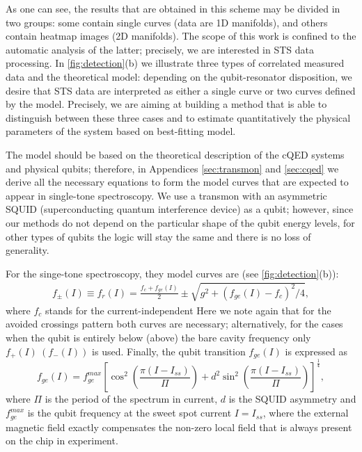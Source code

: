 \documentclass[%
 aip,
 draft,
 amsmath,amssymb,
 reprint,%
]{revtex4-1}
\begin{document}
As one can see, the results that are obtained in this scheme may be divided in two groups: some contain single curves (data are 1D manifolds), and others contain heatmap images (2D manifolds). The scope of this work is confined to the automatic analysis of the latter; precisely, we are interested in STS data processing. In \autoref{fig:detection}(b) we illustrate three types of correlated measured data and the theoretical model: depending on the qubit-resonator disposition, we desire that STS data are interpreted as either a single curve or two curves defined by the model. Precisely, we are aiming at building a method that is able to distinguish between these three cases and to estimate quantitatively the physical parameters of the system based on best-fitting model. 

The model should be based on the theoretical description of the cQED systems and physical qubits; therefore, in Appendices \ref{sec:transmon} and \ref{sec:cqed} we derive all the necessary equations to form the model curves that are expected to appear in single-tone spectroscopy. We use a transmon\cite{koch2007} with an asymmetric SQUID (superconducting quantum interference device) as a qubit; however, since our methods do not depend on the particular shape of the qubit energy levels, for other types of qubits the logic will stay the same and there is no loss of generality.

For the singe-tone spectroscopy, they model curves are (see \autoref{fig:detection}(b)):
\begin{align}
f_\pm(I) \equiv f_r(I) = \frac{f_c + f_{ge}(I)}{2} \pm \sqrt{g^2+(f_{ge}(I) - f_c)^2/4},\label{eq:f_r}
\end{align}
where $f_c$ stands for the current-independent  Here we note again that for the avoided crossings pattern both curves are necessary; alternatively, for the cases when the qubit is entirely below (above) the bare cavity frequency only $ f_+(I)\ \left(f_-(I)\right)$ is used. Finally, the qubit transition $f_{ge}(I)$ is expressed as
\begin{equation}
f_{ge}(I) = f_{ge}^{max} \left[\cos^2\left(\frac{\pi(I-I_{ss})}{\Pi}\right)+d^2 \sin^2 \left(\frac{\pi(I-I_{ss})}{\Pi}\right)\right]^\frac{1}{4},
\label{eq:tr_spectrum}
\end{equation}
where $\Pi$ is the period of the spectrum in current, $d$ is the SQUID asymmetry and $f_{ge}^{max}$ is the qubit frequency at the sweet spot current $I = I_{ss}$, where the external magnetic field exactly compensates the non-zero local field that is always present on the chip in experiment.
\end{document}
